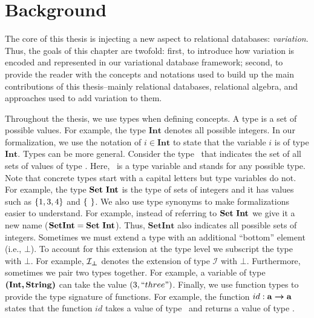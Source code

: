 \chapter{Background}
\label{ch:bg}


The core of this thesis is injecting a new aspect to relational databases: \emph{variation}.
Thus, the goals of this chapter are twofold: 
%
first, to introduce how variation is encoded and represented in our variational database framework;
%
second, to provide the reader with the concepts and notations
used to build up the main contributions of this thesis--mainly relational databases,
relational algebra,
%
and approaches used to add variation to them.

%
Throughout the thesis, we use types when defining concepts. 
A type is a set of possible values. For example, the type $\mathbf{Int}$
denotes all possible integers. In our formalization, we use the notation of $i \in \mathbf{Int}$ to
state that the variable $i$ is of type $\mathbf{Int}$. 
%
Types can be more general. Consider the type \settype \typevar\ that indicates the set of all sets
 of values of type \typevar. Here, \typevar\ is a type variable and stands for any possible type. 
Note that concrete types start with a capital letters but type variables do not.
For example, the type $\settype {\mathbf{Int}}$ is the type of
sets of integers and it has values such as $\setDef {1,3,4}$ and $\setDef {\ }$.
We also use type synonyms to make formalizations easier to understand. 
For example, instead of referring to
$\settype {\mathbf{Int}}$ we give it a new name ($\mathbf{SetInt}= \settype {\mathbf{Int}}$).
Thus,  $\mathbf{SetInt}$ also indicates all possible sets of integers.
%
Sometimes we must extend a type with an additional ``bottom'' element (i.e., $\bot$). To account for this
extension at the type level we subscript the type with $\bot$. For example, $\maybe {\mathcal{I}}$
denotes the extension of  type $\mathcal{I}$ with $\bot$.
%
Furthermore, sometimes we pair two types together. For example, a variable of type $\typepair{\mathbf{Int}} {\mathbf{String}}$ can take the value $(3,``three")$. 
%
Finally, we use function types to provide the type signature of functions. For example,
the function $id : \typevar \totype \typevar$ states that the function $id$ takes a value of
type \typevar\ and returns a value of type \typevar. 

